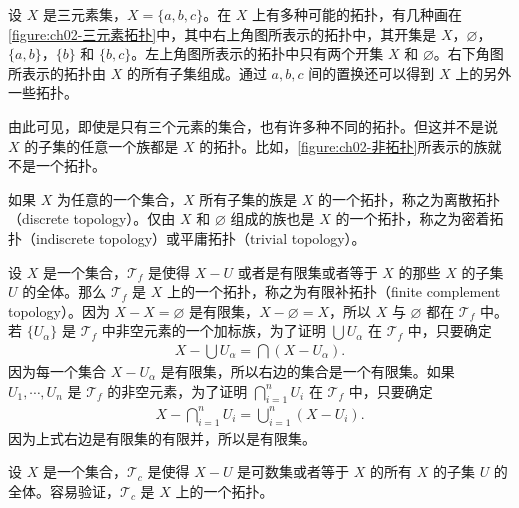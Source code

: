 \documentclass[../../main.tex]{subfiles}
\begin{document}
\begin{example}\label{example:ch02-三元素拓扑}
设 $X$ 是三元素集，$X = \{a, b, c\}$。在 $X$ 上有多种可能的拓扑，有几种画在\cref{figure:ch02-三元素拓扑}中，其中右上角图所表示的拓扑中，其开集是 $X$，$\varnothing$，$\{a, b\}$，$\{b\}$ 和 $\{b, c\}$。左上角图所表示的拓扑中只有两个开集 $X$ 和 $\varnothing$。右下角图所表示的拓扑由 $X$ 的所有子集组成。通过 $a, b, c$ 间的置换还可以得到 $X$ 上的另外一些拓扑。


由此可见，即使是只有三个元素的集合，也有许多种不同的拓扑。但这并不是说 $X$ 的子集的任意一个族都是 $X$ 的拓扑。比如，\cref{figure:ch02-非拓扑}所表示的族就不是一个拓扑。

\end{example}

\begin{example}\label{example:ch02-离散与密着拓扑}
如果 $X$ 为任意的一个集合，$X$ 所有子集的族是 $X$ 的一个拓扑，称之为离散拓扑（discrete topology）。仅由 $X$ 和 $\varnothing$ 组成的族也是 $X$ 的一个拓扑，称之为密着拓扑（indiscrete topology）或平庸拓扑（trivial topology）。
\end{example}

\begin{example}\label{example:ch02-有限补拓扑}
设 $X$ 是一个集合，$\mathcal{T}_{f}$ 是使得 $X - U$ 或者是有限集或者等于 $X$ 的那些 $X$ 的子集 $U$ 的全体。那么 $\mathcal{T}_{f}$ 是 $X$ 上的一个拓扑，称之为有限补拓扑（finite complement topology）。因为 $X - X = \varnothing$ 是有限集，$X - \varnothing = X$，所以 $X$ 与 $\varnothing$ 都在 $\mathcal{T}_{f}$ 中。若 $\{U_{\alpha}\}$ 是 $\mathcal{T}_{f}$ 中非空元素的一个加标族，为了证明 $\bigcup U_{\alpha}$ 在 $\mathcal{T}_{f}$ 中，只要确定
\begin{align*}
X - \bigcup U_{\alpha} = \bigcap (X - U_{\alpha}).
\end{align*}
因为每一个集合 $X - U_{\alpha}$ 是有限集，所以右边的集合是一个有限集。如果 $U_{1}, \cdots, U_{n}$ 是 $\mathcal{T}_{f}$ 的非空元素，为了证明 $\bigcap_{i=1}^{n} U_{i}$ 在 $\mathcal{T}_{f}$ 中，只要确定
\begin{align*}
X - \bigcap_{i=1}^{n} U_{i} = \bigcup_{i=1}^{n} (X - U_{i}).
\end{align*}
因为上式右边是有限集的有限并，所以是有限集。
\end{example}

\begin{example}\label{example:ch02-可数补拓扑}
设 $X$ 是一个集合，$\mathcal{T}_{c}$ 是使得 $X - U$ 是可数集或者等于 $X$ 的所有 $X$ 的子集 $U$ 的全体。容易验证，$\mathcal{T}_{c}$ 是 $X$ 上的一个拓扑。
\end{example}
\end{document}
